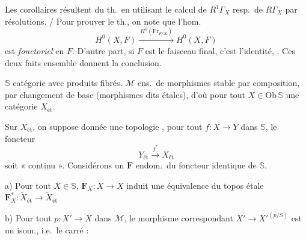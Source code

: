 \documentclass[11pt,a4paper]{article}
\begin{document}
Les corollaires résultent du th.\ en utilisant le calcul de $R^1\Gamma_X$
resp.\ de $R\Gamma_X$ par résolutions. / Pour prouver le
th., on note que \struck{\ill{} \ill{} \ill{} \ill{} \ill{} \ill{}}
\struck{\ill{} \ill{} \ill{} \ill{}} l'hom.
\[
  H^0(X, F) \xrightarrow{\ H^0(\mathrm{Fr}_{F/X})\ } H^0(X, F)
\]
est \emph{fonctoriel} en $F$. D'autre part,
si $F$ est le faisceau final, c'est l'identité,  \ill{}
\ill{} \ill{}. Ces deux faits ensemble donnent 
\ill{} la conclusion.


$\mathbb{S}$ catégorie avec produits fibrés.
$\mathcal{M}$ ens.\ de morphismes stable par composition, par
changement de base (morphismes dits étales), d'où pour tout
$X \in \mathrm{Ob}\,\mathbb{S}$ une catégorie $X_{\text{ét}}$.

Sur  $X_{\text{ét}}$, on suppose donnée une topologie
, \ill{} \ill{} \ill{} pour tout $f : X \to Y$ dans $\mathbb{S}$, le
foncteur
\[
  Y_{\text{ét}} \xrightarrow{\ f^{*}\ } X_{\text{ét}}
\]
 soit « continu ».
Considérons \struck{\ill{}} un \ill{} $\mathbf{F}$ endom.\
du foncteur identique de $\mathbb{S}$.

a) Pour tout $X \in \mathbb{S}$, $\mathbf{F}_X : X \to X$ induit
une équivalence du topos étale
$\mathbf{F}_X^{*} : \widetilde{X}_{\text{ét}} \to \widetilde{X}_{\text{ét}}$

b) Pour tout $p : X' \to X$ dans $\mathcal{M}$, le morphisme correspondant
$X' \to X'^{(p/S)}$ est un isom., i.e.\ le carré :


\end{document}
